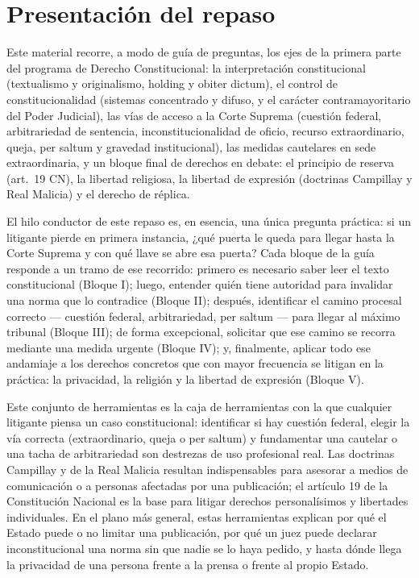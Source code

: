 \documentclass[12pt,oneside]{book}
\begin{document}
\chapter*{Presentación del repaso}

Este material recorre, a modo de guía de preguntas, los ejes de la primera parte del programa de Derecho Constitucional: la interpretación constitucional (textualismo y originalismo, holding y obiter dictum), el control de constitucionalidad (sistemas concentrado y difuso, y el carácter contramayoritario del Poder Judicial), las vías de acceso a la Corte Suprema (cuestión federal, arbitrariedad de sentencia, inconstitucionalidad de oficio, recurso extraordinario, queja, per saltum y gravedad institucional), las medidas cautelares en sede extraordinaria, y un bloque final de derechos en debate: el principio de reserva (art.\ 19 CN), la libertad religiosa, la libertad de expresión (doctrinas Campillay y Real Malicia) y el derecho de réplica.

El hilo conductor de este repaso es, en esencia, una única pregunta práctica: si un litigante pierde en primera instancia, ¿qué puerta le queda para llegar hasta la Corte Suprema y con qué llave se abre esa puerta? Cada bloque de la guía responde a un tramo de ese recorrido: primero es necesario saber leer el texto constitucional (Bloque I); luego, entender quién tiene autoridad para invalidar una norma que lo contradice (Bloque II); después, identificar el camino procesal correcto --- cuestión federal, arbitrariedad, per saltum --- para llegar al máximo tribunal (Bloque III); de forma excepcional, solicitar que ese camino se recorra mediante una medida urgente (Bloque IV); y, finalmente, aplicar todo ese andamiaje a los derechos concretos que con mayor frecuencia se litigan en la práctica: la privacidad, la religión y la libertad de expresión (Bloque V).

\begin{important}
Este conjunto de herramientas es la caja de herramientas con la que cualquier litigante piensa un caso constitucional: identificar si hay cuestión federal, elegir la vía correcta (extraordinario, queja o per saltum) y fundamentar una cautelar o una tacha de arbitrariedad son destrezas de uso profesional real. Las doctrinas Campillay y de la Real Malicia resultan indispensables para asesorar a medios de comunicación o a personas afectadas por una publicación; el artículo 19 de la Constitución Nacional es la base para litigar derechos personalísimos y libertades individuales. En el plano más general, estas herramientas explican por qué el Estado puede o no limitar una publicación, por qué un juez puede declarar inconstitucional una norma sin que nadie se lo haya pedido, y hasta dónde llega la privacidad de una persona frente a la prensa o frente al propio Estado.
\end{important}
\end{document}
